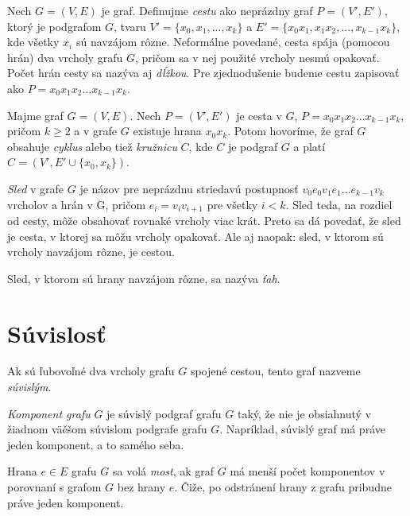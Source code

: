Nech $G = (V, E)$ je graf. Definujme \textit{cestu} ako neprázdny graf $P = (V', E')$, ktorý je podgrafom $G$, tvaru $V' = \{x_{0}, x_{1}, ..., x_{k}\}$ a $E' = \{x_{0} x_{1}, x_{1} x_{2}, ..., x_{k-1} x_{k}\}$, kde všetky $x_{i}$ sú navzájom rôzne. Neformálne povedané, cesta spája (pomocou hrán) dva vrcholy grafu $G$, pričom sa v nej použité vrcholy nesmú opakovať. Počet hrán cesty sa nazýva aj \textit{dĺžkou}. Pre zjednodušenie budeme cestu zapisovať ako $P = x_{0} x_{1} x_{2} ... x_{k-1} x_{k}$.\newline

Majme graf $G = (V, E)$. Nech $P = (V', E')$ je cesta v $G$, $P = x_{0} x_{1} x_{2} ... x_{k-1} x_{k}$, pričom $k\geq 2$ a v grafe $G$ existuje hrana $x_{0}x_{k}$. Potom hovoríme, že graf $G$ obsahuje \textit{cyklus} alebo tiež \textit{kružnicu} $C$, kde $C$ je podgraf $G$ a platí $C = (V', E' \cup \{x_{0},x_{k}\})$. \newline

\textit{Sled} v grafe $G$ je názov pre neprázdnu striedavú postupnosť $v_{0}e_{0}v_{1}e_{1} ... e_{k-1}v_{k}$ vrcholov a hrán v G, pričom $e_{i} = v_{i}v_{i+1}$ pre všetky $i < k$. Sled teda, na rozdiel od cesty, môže obsahovať rovnaké vrcholy viac krát. Preto sa dá povedať, že sled je cesta, v ktorej sa môžu vrcholy opakovať. Ale aj naopak: sled, v ktorom sú vrcholy navzájom rôzne, je cestou.\newline

Sled, v ktorom sú hrany navzájom rôzne, sa nazýva \textit{ťah}.\newline


\section{Súvislosť}

Ak sú ľubovoľné dva vrcholy grafu $G$ spojené cestou, tento graf nazveme \textit{súvislým}. \newline

\textit{Komponent grafu} $G$ je súvislý podgraf grafu $G$ taký, že nie je obsiahnutý v žiadnom väčšom súvislom podgrafe grafu $G$. Napríklad, súvislý graf má práve jeden komponent, a to samého seba.\newline

Hrana $e \in E$ grafu $G$ sa volá \textit{most}, ak graf $G$ má menší počet komponentov v porovnaní s grafom $G$ bez hrany $e$. Čiže, po odstránení hrany z grafu pribudne práve jeden komponent.\newline

